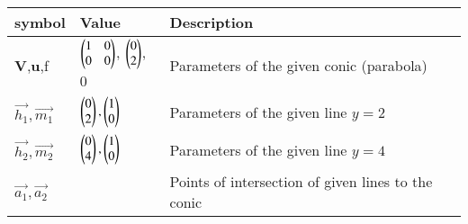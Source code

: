 \begin{tabular}{|m{5em} | m{7em} | m{10em} |}
    \hline
    \textbf{symbol} & \textbf{Value} & \textbf{Description}\\
    \hline
        \textbf{V},\textbf{u},f & $\begin{pmatrix} 1 & 0\\0 & 0\end{pmatrix}$, $\begin{pmatrix}0\\2\end{pmatrix}$, 0 & Parameters of the given conic (parabola)\\
    \hline
        $\vec{h_1}, \vec{m_1}$ & $\begin{pmatrix}0\\2\end{pmatrix}, \begin{pmatrix}1\\0\end{pmatrix}$ & Parameters of the given line $y = 2$\\
    \hline
        $\vec{h_2}, \vec{m_2}$ & $\begin{pmatrix}0\\4\end{pmatrix}, \begin{pmatrix}1\\0\end{pmatrix}$ & Parameters of the given line $y = 4$\\
    \hline
        $\vec{a_1}, \vec{a_2}$ & & Points of intersection of given lines to the conic\\
    \hline
\end{tabular}
